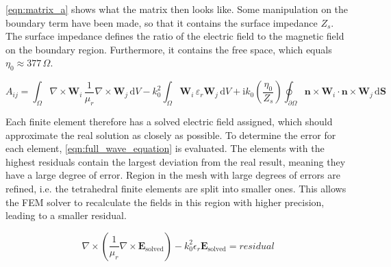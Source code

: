 \autoref{eqn:matrix_a} shows what the matrix then looks like. Some manipulation on the boundary term have been made, so that it contains the surface impedance $Z_s$. The surface impedance defines the ratio of the electric field to the magnetic field on the boundary region. Furthermore, it contains the free space, which equals $\eta_0 \approx 377\,\Omega$.

\begin{equation}
A_{ij} = \int_{\Omega} \nabla \times \mathbf{W}_i \, \frac{1}{\mu_r} \nabla \times \mathbf{W}_j \, \mathrm{d}V 
- k_0^2 \int_{\Omega} \mathbf{W}_i \, \varepsilon_r \mathbf{W}_j \, \mathrm{d}V 
+ \mathrm{i} k_0 \left(\frac{\eta_0}{Z_s}\right) \oint_{\partial\Omega} \mathbf{n} \times \mathbf{W}_i \cdot \mathbf{n} \times \mathbf{W}_j \, \mathrm{d}\mathbf{S}
\label{eqn:matrix_a}
\end{equation}

Each finite element therefore has a solved electric field assigned, which should approximate the real solution as closely as possible. To determine the error for each element, \autoref{eqn:full_wave_equation} is evaluated. The elements with the highest residuals contain the largest deviation from the real result, meaning they have a large degree of error. Region in the mesh with large degrees of errors are refined, i.e. the tetrahedral finite elements are split into smaller ones. This allows the FEM solver to recalculate the fields in this region with higher precision, leading to a smaller residual.

\begin{equation}
    \nabla\times\left(\frac{1}{\mu_r}\nabla\times\mathbf{E}_{\mathrm{solved}}\right)-k_0^2\epsilon_r\mathbf{E}_{\mathrm{solved}}=residual
    \label{eqn:full_wave_equation_solved}
\end{equation}






